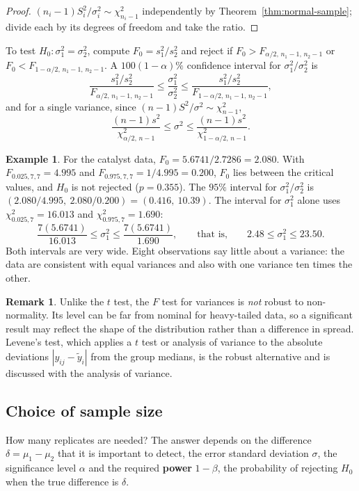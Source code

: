 \documentclass[11pt,a4paper]{article}
\numberwithin{equation}{section}
\theoremstyle{definition}
\newtheorem{exa}[thm]{Example}
\newtheorem*{remark}{Remark}
\begin{document}
\begin{proof}
$(n_i - 1)S_i^2/\sigma_i^2 \sim \chi^2_{n_i-1}$ independently by Theorem~\ref{thm:normal-sample}; divide each by its degrees of freedom and take the ratio.
\end{proof}

To test $H_0 : \sigma_1^2 = \sigma_2^2$, compute $F_0 = s_1^2/s_2^2$ and reject if $F_0 > F_{\alpha/2,\,n_1-1,\,n_2-1}$ or $F_0 < F_{1-\alpha/2,\,n_1-1,\,n_2-1}$. A
$100(1 - \alpha)\%$ confidence interval for $\sigma_1^2/\sigma_2^2$ is
\[
\frac{s_1^2/s_2^2}{F_{\alpha/2,\,n_1-1,\,n_2-1}} \le \frac{\sigma_1^2}{\sigma_2^2} \le \frac{s_1^2/s_2^2}{F_{1-\alpha/2,\,n_1-1,\,n_2-1}} ,
\]
and for a single variance, since $(n - 1)S^2/\sigma^2 \sim \chi^2_{n-1}$,
\[
\frac{(n - 1)s^2}{\chi^2_{\alpha/2,\,n-1}} \le \sigma^2 \le \frac{(n - 1)s^2}{\chi^2_{1-\alpha/2,\,n-1}} .
\]

\begin{exa}
For the catalyst data, $F_0 = 5.6741/2.7286 = 2.080$. With $F_{0.025,7,7} = 4.995$ and $F_{0.975,7,7} = 1/4.995 = 0.200$, $F_0$ lies between the critical values,
and $H_0$ is not rejected ($p = 0.355$). The $95\%$ interval for $\sigma_1^2/\sigma_2^2$ is $(2.080/4.995,\ 2.080/0.200) = (0.416,\ 10.39)$. The interval for $\sigma_1^2$ alone
uses $\chi^2_{0.025,7} = 16.013$ and $\chi^2_{0.975,7} = 1.690$:
\[
\frac{7(5.6741)}{16.013} \le \sigma_1^2 \le \frac{7(5.6741)}{1.690} , \qquad\text{that is,}\qquad 2.48 \le \sigma_1^2 \le 23.50 .
\]
Both intervals are very wide. Eight observations say little about a variance: the data are consistent with equal variances and also with one
variance ten times the other.
\end{exa}

\begin{remark}
Unlike the $t$ test, the $F$ test for variances is \emph{not} robust to non-normality. Its level can be far from nominal for heavy-tailed data, so a
significant result may reflect the shape of the distribution rather than a difference in spread. Levene's test, which applies a $t$ test or analysis
of variance to the absolute deviations $|y_{ij} - \tilde y_i|$ from the group medians, is the robust alternative and is discussed with the analysis of
variance.
\end{remark}

\subsection{Choice of sample size}
How many replicates are needed? The answer depends on the difference $\delta = \mu_1 - \mu_2$ that it is important to detect, the error standard
deviation $\sigma$, the significance level $\alpha$ and the required \textbf{power} $1 - \beta$, the probability of rejecting $H_0$ when the true difference is $\delta$.
\end{document}
